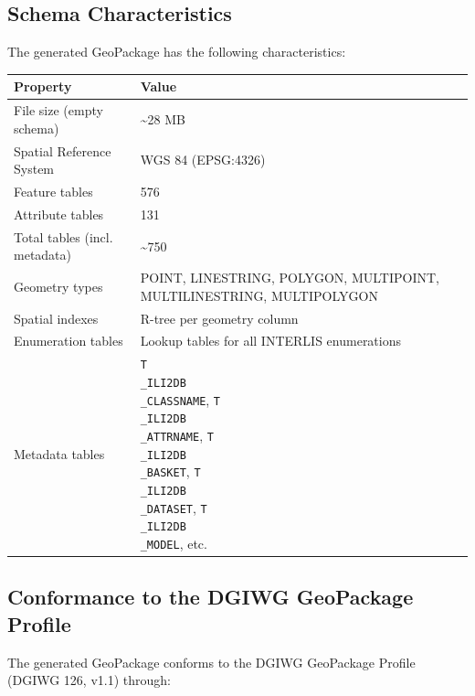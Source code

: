 \documentclass[conference]{IEEEtran}
\begin{document}
\subsection{Schema Characteristics}

The generated GeoPackage has the following characteristics:

\begin{center}
\begin{longtable}{p{}p{}}
Property & Value \\
\midrule
File size (empty schema) & \textasciitilde{}28 MB \\
Spatial Reference System & WGS 84 (EPSG:4326) \\
Feature tables & 576 \\
Attribute tables & 131 \\
Total tables (incl. metadata) & \textasciitilde{}750 \\
Geometry types & POINT, LINESTRING, POLYGON, MULTIPOINT, MULTILINESTRING, MULTIPOLYGON \\
Spatial indexes & R-tree per geometry column \\
Enumeration tables & Lookup tables for all INTERLIS enumerations \\
Metadata tables & \texttt{T\\_ILI2DB\\_CLASSNAME}, \texttt{T\\_ILI2DB\\_ATTRNAME}, \texttt{T\\_ILI2DB\\_BASKET}, \texttt{T\\_ILI2DB\\_DATASET}, \texttt{T\\_ILI2DB\\_MODEL}, etc. \\
\end{longtable}
\end{center}


\subsection{Conformance to the DGIWG GeoPackage Profile}

The generated GeoPackage conforms to the DGIWG GeoPackage Profile (DGIWG 126, v1.1) through:
\end{document}
